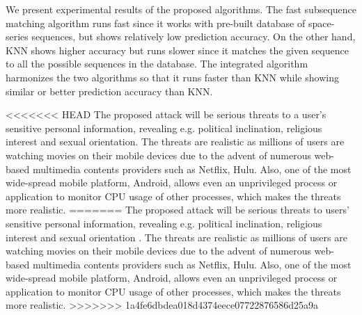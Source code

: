 We present experimental results of the proposed algorithms. The fast subsequence matching algorithm runs fast since it works with pre-built database of space-series sequences, but shows relatively low prediction accuracy.  On the other hand, KNN shows higher accuracy but runs slower since it matches the given sequence to all the possible sequences in the database.  The integrated algorithm harmonizes the two algorithms so that it runs faster than KNN while showing similar or better prediction accuracy than KNN. 

<<<<<<< HEAD
The proposed attack will be serious threats to a user's sensitive personal information, revealing e.g. political inclination, religious interest and sexual orientation. The threats are realistic as millions of users are watching movies on their mobile devices due to the advent of numerous web-based multimedia contents providers such as Netflix, Hulu. Also, one of the most wide-spread mobile platform, Android, allows even an unprivileged process or application to monitor CPU usage of other processes, which makes the threats more realistic. 
=======
The proposed attack will be serious threats to users' sensitive personal information, revealing e.g. political inclination, religious interest and sexual orientation \cite{Frankowski:2006}\cite{chaabane:hal-00748162}. The threats are realistic as millions of users are watching movies on their mobile devices due to the advent of numerous web-based multimedia contents providers such as Netflix, Hulu. Also, one of the most wide-spread mobile platform, Android, allows even an unprivileged process or application to monitor CPU usage of other processes, which makes the threats more realistic. 
>>>>>>> 1a4fe6dbdea018d4374eece07722876586d25a9a
